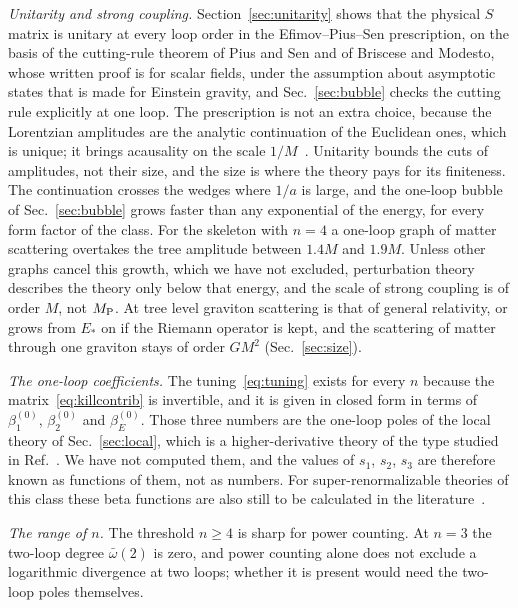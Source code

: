 \documentclass[aps,prd,10pt,twocolumn,superscriptaddress,nofootinbib,floatfix,longbibliography]{revtex4-2}
\begin{document}
\textit{Unitarity and strong coupling.} Section~\ref{sec:unitarity} shows that the physical $S$ matrix is unitary at every loop order in the Efimov--Pius--Sen prescription, on the basis of the cutting-rule theorem of Pius and Sen and of Briscese and Modesto, whose written proof is for scalar fields, under the assumption about asymptotic states that is made for Einstein gravity, and Sec.~\ref{sec:bubble} checks the cutting rule explicitly at one loop. The prescription is not an extra choice, because the Lorentzian amplitudes are the analytic continuation of the Euclidean ones, which is unique; it brings acausality on the scale $1/M$~\cite{Carone2017}. Unitarity bounds the cuts of amplitudes, not their size, and the size is where the theory pays for its finiteness. The continuation crosses the wedges where $1/a$ is large, and the one-loop bubble of Sec.~\ref{sec:bubble} grows faster than any exponential of the energy, for every form factor of the class. For the skeleton with $n=4$ a one-loop graph of matter scattering overtakes the tree amplitude between $1.4M$ and $1.9M$. Unless other graphs cancel this growth, which we have not excluded, perturbation theory describes the theory only below that energy, and the scale of strong coupling is of order $M$, not $M_{\rm P}$. At tree level graviton scattering is that of general relativity, or grows from $E_*$ on if the Riemann operator is kept, and the scattering of matter through one graviton stays of order $GM^2$ (Sec.~\ref{sec:size}).

\textit{The one-loop coefficients.} The tuning~\eqref{eq:tuning} exists for every $n$ because the matrix~\eqref{eq:killcontrib} is invertible, and it is given in closed form in terms of $\beta_1^{(0)}$, $\beta_2^{(0)}$ and $\beta_E^{(0)}$. Those three numbers are the one-loop poles of the local theory of Sec.~\ref{sec:local}, which is a higher-derivative theory of the type studied in Ref.~\cite{AsoreyLopezShapiro1997}. We have not computed them, and the values of $s_1$, $s_2$, $s_3$ are therefore known as functions of them, not as numbers. For super-renormalizable theories of this class these beta functions are also still to be calculated in the literature~\cite{ModestoRachwalShapiro2018}.

\textit{The range of $n$.} The threshold $n\ge4$ is sharp for power counting. At $n=3$ the two-loop degree $\bar\omega(2)$ is zero, and power counting alone does not exclude a logarithmic divergence at two loops; whether it is present would need the two-loop poles themselves.
\end{document}
